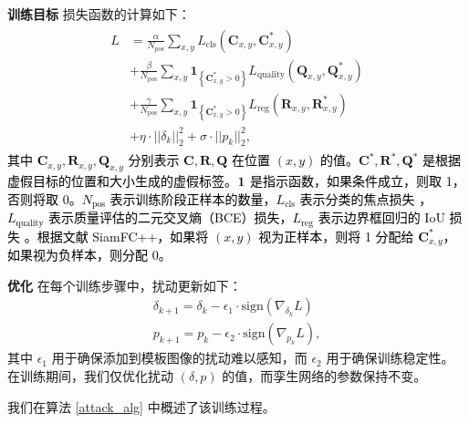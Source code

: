 \textbf{训练目标} 损失函数的计算如下：
\begin{equation}
\begin{array}{l}
\begin{aligned}
L&=\frac{\alpha}{N_{\mathrm{pos}}} \sum_{x, y} L_{\mathrm{cls}}\left(\textbf{C}_{x, y}, \textbf{C}_{x, y}^{*}\right) \\
&+\frac{\beta}{N_{\mathrm{pos}}} \sum_{x, y} \textbf{1}_{\left\{\textbf{C}_{x, y}^{*}>0\right\}} L_{\mathrm{quality}}\left(\textbf{Q}_{x, y}, \textbf{Q}_{x, y}^{*}\right) \\
&+\frac{\gamma}{N_{\mathrm{pos}}} \sum_{x, y} \textbf{1}_{\left\{\textbf{C}_{x, y}^{*}>0\right\}} L_{\mathrm{reg}}\left(\textbf{R}_{x, y}, \textbf{R}_{x, y}^{*}\right) \\
&+\eta \cdot ||\delta_k||_2^2 +  \sigma \cdot ||p_k||^2_2,
\end{aligned}
\end{array}
\label{eq:loss}
\end{equation}
\textcolor{black} %
{其中 $\textbf{C}_{x, y}, \textbf{R}_{x, y}, \textbf{Q}_{x, y}$ 分别表示 $\textbf{C}, \textbf{R}, \textbf{Q}$ 在位置 $(x, y)$ 的值。$\textbf{C}^*, \textbf{R}^*, \textbf{Q}^*$ 是根据虚假目标的位置和大小生成的虚假标签。$\textbf 1$ 是指示函数，如果条件成立，则取 1，否则将取 0。$N_{\mathrm{pos}}$ 表示训练阶段正样本的数量，$L_{\mathrm{cls}}$ 表示分类的焦点损失 \cite{focal}，$L_{\mathrm{quality}}$ 表示质量评估的二元交叉熵（BCE）损失，$L_{\mathrm{reg}}$ 表示边界框回归的 IoU 损失 \cite{iou-loss}。根据文献 SiamFC++，如果将 $(x, y)$ 视为正样本，则将 1 分配给 $\textbf{C}_{x, y}^{*}$，如果视为负样本，则分配 0。}

\textbf{优化} 在每个训练步骤中，扰动更新如下：
\begin{gather}
\delta_{k+1} = \delta_{k} - \epsilon_1 \cdot \text{sign}(\nabla_{\delta_k}L)\\
p_{k+1} = p_{k} - \epsilon_2 \cdot \text{sign}(\nabla_{p_k}L),
\end{gather}
其中 $\epsilon_1$ 用于确保添加到模板图像的扰动难以感知，而 $\epsilon_2$ 用于确保训练稳定性。
在训练期间，我们仅优化扰动 $(\delta, p)$ 的值，而孪生网络的参数保持不变。

我们在算法 \ref{attack_alg} 中概述了该训练过程。

